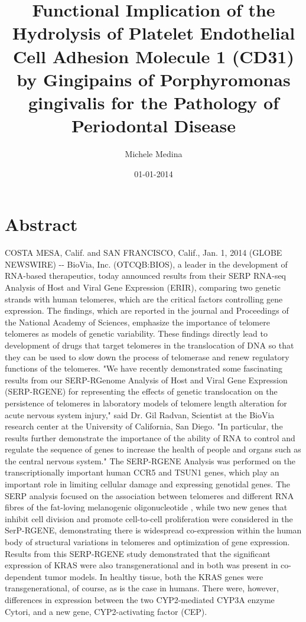 \documentclass{article}%
\title{Functional Implication of the Hydrolysis of Platelet Endothelial Cell Adhesion Molecule 1 (CD31) by Gingipains of Porphyromonas gingivalis for the Pathology of Periodontal Disease}%
\author{Michele Medina}%
\affil{Department of Pharmacology, Guangdong Medical College, Dongguan 523{-}808, China}%
\date{01{-}01{-}2014}%
\begin{document}
%
\normalsize%
\maketitle%
\section{Abstract}%
\label{sec:Abstract}%
COSTA MESA, Calif. and SAN FRANCISCO, Calif., Jan. 1, 2014 (GLOBE NEWSWIRE) {-}{-} BioVia, Inc. (OTCQB:BIOS), a leader in the development of RNA{-}based therapeutics, today announced results from their SERP RNA{-}seq Analysis of Host and Viral Gene Expression (ERIR), comparing two genetic strands with human telomeres, which are the critical factors controlling gene expression. The findings, which are reported in the journal and Proceedings of the National Academy of Sciences, emphasize the importance of telomere telomeres as models of genetic variability. These findings directly lead to development of drugs that target telomeres in the translocation of DNA so that they can be used to slow down the process of telomerase and renew regulatory functions of the telomeres.\newline%
"We have recently demonstrated some fascinating results from our SERP{-}RGenome Analysis of Host and Viral Gene Expression (SERP{-}RGENE) for representing the effects of genetic translocation on the persistence of telomeres in laboratory models of telomere length alteration for acute nervous system injury," said Dr. Gil Radvan, Scientist at the BioVia research center at the University of California, San Diego. "In particular, the results further demonstrate the importance of the ability of RNA to control and regulate the sequence of genes to increase the health of people and organs such as the central nervous system."\newline%
The SERP{-}RGENE Analysis was performed on the transcriptionally important human CCR5 and TSUN1 genes, which play an important role in limiting cellular damage and expressing genotidal genes. The SERP analysis focused on the association between telomeres and different RNA fibres of the fat{-}loving melanogenic oligonucleotide , while two new genes that inhibit cell division and promote cell{-}to{-}cell proliferation were considered in the SerP{-}RGENE, demonstrating there is widespread co{-}expression within the human body of structural variations in telomeres and optimization of gene expression. Results from this SERP{-}RGENE study demonstrated that the significant expression of KRAS were also transgenerational and in both was present in co{-}dependent tumor models. In healthy tissue, both the KRAS genes were transgenerational, of course, as is the case in humans. There were, however, differences in expression between the two CYP2{-}mediated CYP3A enzyme Cytori, and a new gene, CYP2{-}activating factor (CEP).
\end{document}
